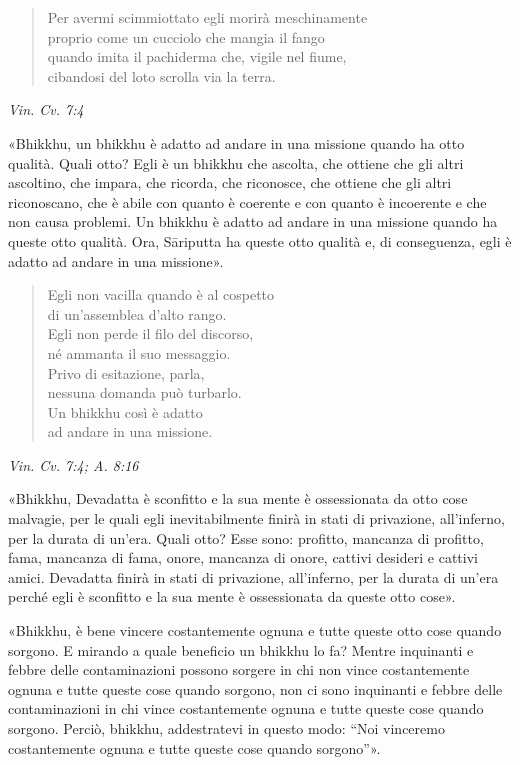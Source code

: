 \begin{quote}
Per avermi scimmiottato egli morirà meschinamente \\
proprio come un cucciolo che mangia il fango \\
quando imita il pachiderma che, vigile nel fiume, \\
cibandosi del loto scrolla via la terra.
\end{quote}

\emph{Vin. Cv. 7:4}


«Bhikkhu, un bhikkhu è adatto ad andare in una missione quando ha otto
qualità. Quali otto? Egli è un bhikkhu che ascolta, che ottiene che gli
altri ascoltino, che impara, che ricorda, che riconosce, che ottiene che
gli altri riconoscano, che è abile con quanto è coerente e con quanto è
incoerente e che non causa problemi. Un bhikkhu è adatto ad andare in
una missione quando ha queste otto qualità. Ora, Sāriputta ha queste
otto qualità e, di conseguenza, egli è adatto ad andare in una
missione».


\begin{quote}
Egli non vacilla quando è al cospetto \\
di un’assemblea d’alto rango. \\
Egli non perde il filo del discorso, \\
né ammanta il suo messaggio. \\
Privo di esitazione, parla, \\
nessuna domanda può turbarlo. \\
Un bhikkhu così è adatto \\
ad andare in una missione.
\end{quote}

\emph{Vin. Cv. 7:4; A. 8:16}


«Bhikkhu, Devadatta è sconfitto e la sua mente è ossessionata da otto
cose malvagie, per le quali egli inevitabilmente finirà in stati di
privazione, all’inferno, per la durata di un’era. Quali otto? Esse sono:
profitto, mancanza di profitto, fama, mancanza di fama, onore, mancanza
di onore, cattivi desideri e cattivi amici. Devadatta finirà in stati di
privazione, all’inferno, per la durata di un’era perché egli è sconfitto
e la sua mente è ossessionata da queste otto cose».


«Bhikkhu, è bene vincere costantemente ognuna e tutte queste otto cose
quando sorgono. E mirando a quale beneficio un bhikkhu lo fa? Mentre
inquinanti e febbre delle contaminazioni possono sorgere in chi non
vince costantemente ognuna e tutte queste cose quando sorgono, non ci
sono inquinanti e febbre delle contaminazioni in chi vince costantemente
ognuna e tutte queste cose quando sorgono. Perciò, bhikkhu, addestratevi
in questo modo: “Noi vinceremo costantemente ognuna e tutte queste cose
quando sorgono”».


